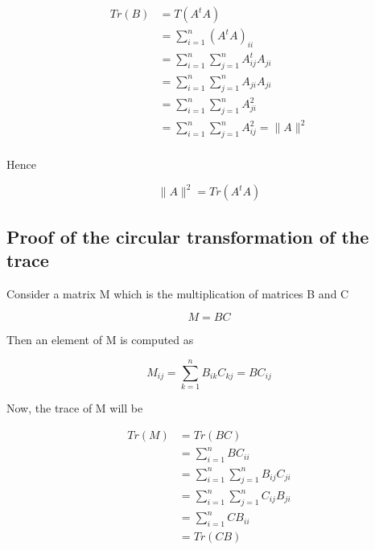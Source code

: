 \documentclass[12pt,journal]{IEEEtran}
\begin{document}
    \begin{equation*}
        \begin{aligned}
            Tr(B) &= T(A^tA)\\
                  &= \sum_{i=1}^n (A^tA)_{ii}\\
                  &= \sum_{i=1}^n \sum_{j=1}^n A_{ij}^t A_{ji}\\
                  &= \sum_{i=1}^n \sum_{j=1}^n A_{ji} A_{ji}\\
                  &= \sum_{i=1}^n \sum_{j=1}^n A_{ji}^2 \\
                  &= \sum_{i=1}^n \sum_{j=1}^n A_{ij}^2 = \lVert A \rVert^2 \\
        \end{aligned}
    \end{equation*}

    Hence

    \begin{equation*}
        \lVert A \rVert^2 = Tr(A^tA)
    \end{equation*}

    \subsection{Proof of the circular transformation of the trace} \label{circular_trace}

    Consider a matrix M which is the multiplication of matrices B and C

    \begin{equation*}
        M = BC
    \end{equation*}

    Then an element of M is computed as

    \begin{equation*}
        M_{ij} = \sum_{k=1}^n B_{ik} C_{kj} = BC_{ij}
    \end{equation*}

    Now, the trace of M will be

    \begin{equation*}
        \begin{aligned}
            Tr(M) &= Tr(BC)\\
                  &= \sum_{i=1}^n BC_{ii}\\
                  &= \sum_{i=1}^n \sum_{j=1}^n B_{ij} C_{ji}\\
                  &= \sum_{i=1}^n \sum_{j=1}^n C_{ij} B_{ji}\\
                  &= \sum_{i=1}^n CB_{ii}\\
                  &= Tr(CB)
        \end{aligned}
    \end{equation*}
\end{document}
